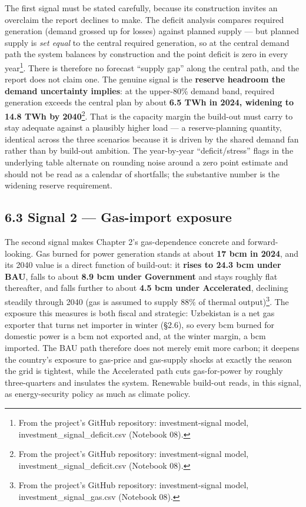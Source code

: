 \documentclass[10pt,twocolumn]{article}
\begin{document}
The first signal must be stated carefully, because its construction invites an overclaim the report declines to make. The deficit analysis compares required generation (demand grossed up for losses) against planned supply --- but planned supply is \textit{set equal} to the central required generation, so at the central demand path the system balances by construction and the point deficit is zero in every year\footnote{From the project's GitHub repository: investment-signal model, investment\_signal\_deficit.csv (Notebook 08).}. There is therefore no forecast ``supply gap'' along the central path, and the report does not claim one. The genuine signal is the \textbf{reserve headroom the demand uncertainty implies}: at the upper-80\% demand band, required generation exceeds the central plan by about \textbf{6.5 TWh in 2024, widening to 14.8 TWh by 2040}\footnote{From the project's GitHub repository: investment-signal model, investment\_signal\_deficit.csv (Notebook 08).}. That is the capacity margin the build-out must carry to stay adequate against a plausibly higher load --- a reserve-planning quantity, identical across the three scenarios because it is driven by the shared demand fan rather than by build-out ambition. The year-by-year ``deficit/stress'' flags in the underlying table alternate on rounding noise around a zero point estimate and should not be read as a calendar of shortfalls; the substantive number is the widening reserve requirement.

\subsection*{6.3 Signal 2 --- Gas-import exposure}

The second signal makes Chapter 2's gas-dependence concrete and forward-looking. Gas burned for power generation stands at about \textbf{17 bcm in 2024}, and its 2040 value is a direct function of build-out: it \textbf{rises to 24.3 bcm under BAU}, falls to about \textbf{8.9 bcm under Government} and stays roughly flat thereafter, and falls further to about \textbf{4.5 bcm under Accelerated}, declining steadily through 2040 (gas is assumed to supply 88\% of thermal output)\footnote{From the project's GitHub repository: investment-signal model, investment\_signal\_gas.csv (Notebook 08).}. The exposure this measures is both fiscal and strategic: Uzbekistan is a net gas exporter that turns net importer in winter (\S{}2.6), so every bcm burned for domestic power is a bcm not exported and, at the winter margin, a bcm imported. The BAU path therefore does not merely emit more carbon; it deepens the country's exposure to gas-price and gas-supply shocks at exactly the season the grid is tightest, while the Accelerated path cuts gas-for-power by roughly three-quarters and insulates the system. Renewable build-out reads, in this signal, as energy-security policy as much as climate policy.
\end{document}
